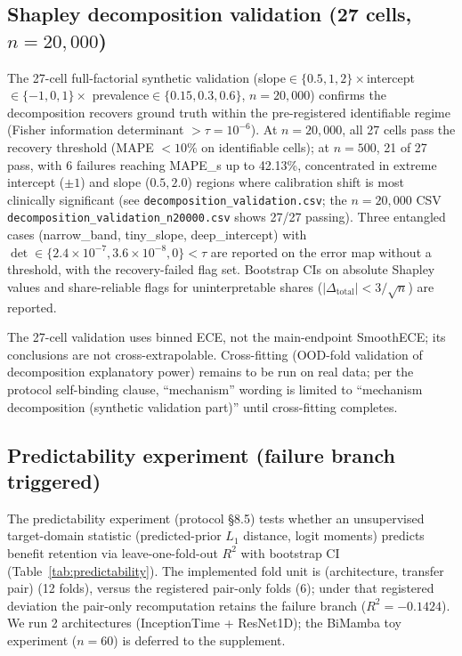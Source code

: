 \documentclass[review,12pt,nonatbib]{elsarticle}
\begin{document}
\subsection{Shapley decomposition validation (27 cells, $n=20{,}000$)}
\label{sec:shapley}
The 27-cell full-factorial synthetic validation
(slope$\in\{0.5,1,2\}\times$intercept$\in\{-1,0,1\}\times$
prevalence$\in\{0.15,0.3,0.6\}$, $n=20{,}000$) confirms the
decomposition recovers ground truth within the pre-registered
identifiable regime (Fisher information determinant $>\tau=10^{-6}$).
At $n=20{,}000$, all 27 cells pass the recovery threshold (MAPE
$<10\%$ on identifiable cells); at $n=500$, 21 of 27 pass, with 6
failures reaching MAPE\_s up to 42.13\%, concentrated in extreme
intercept ($\pm 1$) and slope ($0.5, 2.0$) regions where calibration
shift is most clinically significant (see
\texttt{decomposition\_validation.csv}; the $n=20{,}000$ CSV
\texttt{decomposition\_validation\_}\allowbreak\texttt{n20000.csv}
shows 27/27 passing). Three entangled cases (narrow\_band,
tiny\_slope, deep\_intercept) with
$\det\in\{2.4\times10^{-7}, 3.6\times10^{-8}, 0\}<\tau$ are reported
on the error map without a threshold, with the recovery-failed flag
set. Bootstrap CIs on absolute Shapley values and share-reliable
flags for uninterpretable shares ($|\Delta_{\text{total}}|<3/\sqrt{n}$)
are reported.

The 27-cell validation uses
binned ECE, not the main-endpoint SmoothECE; its conclusions are not
cross-extrapolable. Cross-fitting (OOD-fold validation of
decomposition explanatory power) remains to be run on real data; per
the protocol self-binding clause, ``mechanism'' wording is limited to
``mechanism decomposition (synthetic validation part)'' until
cross-fitting completes.

\subsection{Predictability experiment (failure branch triggered)}
\label{sec:predictability}
The predictability experiment (protocol \S8.5) tests whether an
unsupervised target-domain statistic (predicted-prior $L_1$ distance,
logit moments) predicts benefit retention via leave-one-fold-out
$R^2$ with bootstrap CI (Table~\ref{tab:predictability}). The
implemented fold unit is (architecture, transfer pair) (12 folds),
versus the registered pair-only folds (6); under that registered
deviation the pair-only recomputation retains the failure branch
($R^2=-0.1424$). We run 2 architectures (InceptionTime + ResNet1D);
the BiMamba toy experiment ($n=60$) is deferred to the supplement.
\end{document}

